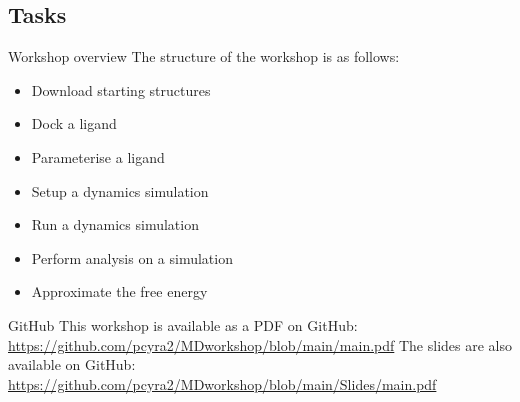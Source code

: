 \subsection{Tasks}
\begin{frame}{Workshop overview}
The structure of the workshop is as follows:
\begin{itemize}
	\item Download starting structures
	\item Dock a ligand
	\item Parameterise a ligand
	\item Setup a dynamics simulation
	\item Run a dynamics simulation
	\item Perform analysis on a simulation
	\item Approximate the free energy
\end{itemize}
\end{frame}

\begin{frame}{GitHub}
This workshop is available as a PDF on GitHub:
\href{https://github.com/pcyra2/MD_workshop/blob/main/main.pdf}{https://github.com/pcyra2/MD\textunderscore workshop/blob/main/main.pdf}
\vspace{1.5 cm}
\newline
The slides are also available on GitHub:
\href{https://github.com/pcyra2/MD_workshop/blob/main/Slides/main.pdf}{https://github.com/pcyra2/MD\textunderscore workshop/blob/main/Slides/main.pdf}
\end{frame}
